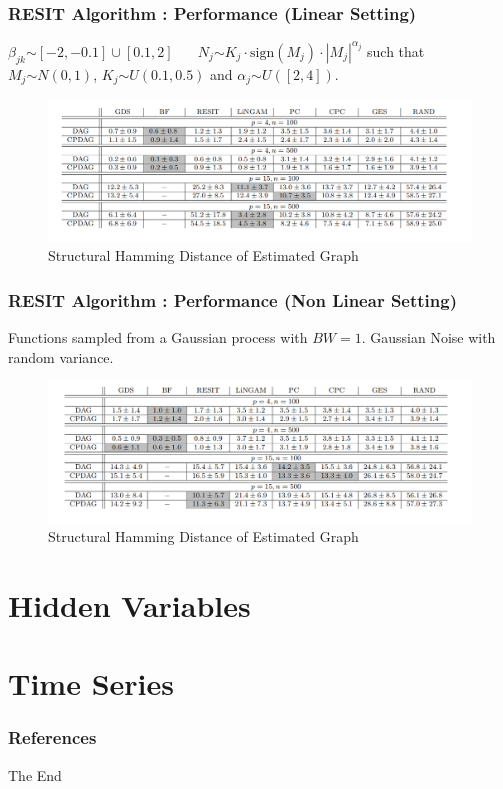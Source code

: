\documentclass{beamer}
\begin{document}
\begin{frame}
\frametitle{RESIT Algorithm : Performance (Linear Setting)}
\begin{center}
\scriptsize{$\beta_{jk} \stackrel{}{\sim} [-2,-0.1] \cup [0.1,2]$
$\;\;\;\;\;N_j \stackrel{}{\sim} K_j \cdot \mathrm{sign}(M_j)\cdot |M_j|^{\alpha_j}$
such that
$M_j \stackrel{}{\sim} N(0,1)$, $K_j \stackrel{}{\sim} U(0.1,0.5)$ 
and
$\alpha_j \stackrel{}{\sim} U([2,4])$. }
\end{center}
\begin{figure}[h!]
	\centering
	\includegraphics[scale=0.28]{linear.png}
	\caption{Structural Hamming Distance of Estimated Graph}
\end{figure}
\end{frame}

\begin{frame}
\frametitle{RESIT Algorithm : Performance (Non Linear Setting)}
\begin{center}
	\scriptsize{
		Functions sampled from a Gaussian process with $BW=1$. Gaussian Noise with random variance.
	}
\end{center}
\begin{figure}[h!]
	\centering
	\includegraphics[scale=0.28]{dif.png}
	\caption{Structural Hamming Distance of Estimated Graph}
\end{figure}
\end{frame}
\section{Hidden Variables}
\section{Time Series}
\begin{frame}
\frametitle{References}


\end{frame}

\begin{frame}
\Huge{\centerline{The End}}
\end{frame}

\end{document}
